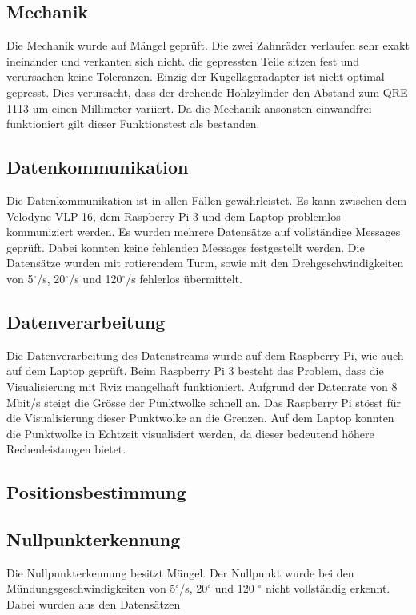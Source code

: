 \subsection {Mechanik}
\label{subsec:Mechanik}
Die Mechanik wurde auf Mängel geprüft. Die zwei Zahnräder verlaufen sehr exakt ineinander und verkanten sich nicht. die gepressten Teile sitzen fest und verursachen keine Toleranzen. Einzig der Kugellageradapter ist nicht optimal gepresst. Dies verursacht, dass der drehende Hohlzylinder den Abstand zum QRE 1113 um einen Millimeter variiert. Da die Mechanik ansonsten einwandfrei funktioniert gilt dieser Funktionstest als bestanden.

\subsection {Datenkommunikation}
\label{subsec:Datenkimmuikation}
Die Datenkommunikation ist in allen Fällen gewährleistet. Es kann zwischen dem Velodyne VLP-16, dem Raspberry Pi 3 und dem Laptop problemlos kommuniziert werden. Es wurden mehrere Datensätze auf vollständige Messages geprüft. Dabei konnten keine fehlenden Messages festgestellt werden. Die Datensätze wurden mit rotierendem Turm, sowie mit den Drehgeschwindigkeiten von 5$^\circ$/s, 20$^\circ$/s und 120$^\circ$/s fehlerlos übermittelt.  

\subsection {Datenverarbeitung}
\label{subsec:Datenverarbeitung}
Die Datenverarbeitung des Datenstreams wurde auf dem Raspberry Pi, wie auch auf dem Laptop geprüft. Beim Raspberry Pi 3 besteht das Problem, dass die Visualisierung mit Rviz mangelhaft funktioniert. Aufgrund der Datenrate von 8 Mbit/s steigt die Grösse der Punktwolke schnell an. Das Raspberry Pi stösst für die Visualisierung dieser Punktwolke an die Grenzen. Auf dem Laptop konnten die Punktwolke in Echtzeit visualisiert werden, da dieser bedeutend höhere Rechenleistungen bietet. 

\subsection {Positionsbestimmung}
\label{subsec:Positionsbestimmung}

\subsection {Nullpunkterkennung}
\label{subsec:testSNullpunkterkennung}
Die Nullpunkterkennung besitzt Mängel. Der Nullpunkt wurde bei den Mündungsgeschwindigkeiten von 5$^\circ$/s, 20$^\circ$ und 120 $^\circ$ nicht vollständig erkennt. Dabei wurden aus den Datensätzen 

